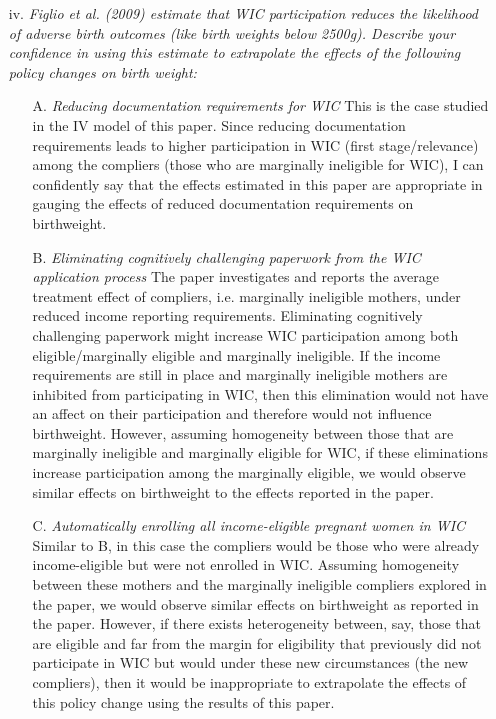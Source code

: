 \documentclass[
]{article}
\begin{document}
\begin{enumerate}
\item[iv.] \textit{Figlio et al. (2009) estimate that WIC participation reduces the likelihood of adverse birth outcomes (like birth weights below 2500g). Describe your confidence in using this estimate to extrapolate the effects of the following policy changes on birth weight:}  
\begin{enumerate}
\item[A.] \textit{Reducing documentation requirements for WIC}
\newline
This is the case studied in the IV model of this paper. Since reducing documentation requirements leads to higher participation in WIC (first stage/relevance) among the compliers (those who are marginally ineligible for WIC), I can confidently say that the effects estimated in this paper are appropriate in gauging the effects of reduced documentation requirements on birthweight. 
\item[B.] \textit{Eliminating cognitively challenging paperwork from the WIC application process}
\newline
The paper investigates and reports the average treatment effect of compliers, i.e. marginally ineligible mothers, under reduced income reporting requirements. Eliminating cognitively challenging paperwork might increase WIC participation among both eligible/marginally eligible and marginally ineligible. If the income requirements are still in place and marginally ineligible mothers are inhibited from participating in WIC, then this elimination would not have an affect on their participation and therefore would not influence birthweight. However, assuming homogeneity between those that are marginally ineligible and marginally eligible for WIC, if these eliminations increase participation among the marginally eligible, we would observe similar effects on birthweight to the effects reported in the paper.  

\item[C.] \textit{Automatically enrolling all income-eligible pregnant women in WIC}
\newline
Similar to B, in this case the compliers would be those who were already income-eligible but were not enrolled in WIC. Assuming homogeneity between these mothers and the marginally ineligible compliers explored in the paper, we would observe similar effects on birthweight as reported in the paper. However, if there exists heterogeneity between, say, those that are eligible and far from the margin for eligibility that previously did not participate in WIC but would under these new circumstances (the new compliers), then it would be inappropriate to extrapolate the effects of this policy change using the results of this paper.  
\end{enumerate}


\end{enumerate}
\end{document}
